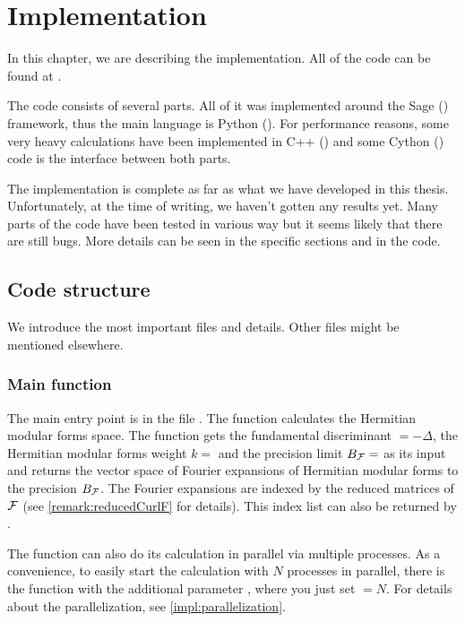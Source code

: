 
\section{Implementation}
\label{chapter:impl}

In this chapter, we are describing the implementation. All of the code can be found at \cite{Zeyer13Github}.

The code consists of several parts.
All of it was implemented around the Sage (\cite{sage}) framework, thus the main language is Python (\cite{python}).
For performance reasons, some very heavy calculations have been implemented in C++ (\cite{cpp}) and some Cython (\cite{cython}) code is the interface between both parts.

The implementation is complete as far as what we have developed in this thesis. Unfortunately, at the time of writing, we haven't gotten any results yet. Many parts of the code have been tested in various way but it seems likely that there are still bugs. More details can be seen in the specific sections and in the code.

\subsection{Code structure}

We introduce the most important files and details. Other files might be mentioned elsewhere.

\subsubsection{Main function }
The main entry point is in the file .
The function  calculates the Hermitian modular forms space.
The function gets the fundamental discriminant  $= - \Delta$, the Hermitian modular forms weight $k =$  and the precision limit $B_{\mathcal{F}} =$  as its input and returns the vector space of Fourier expansions of Hermitian modular forms to the precision $B_{\mathcal{F}}$. The Fourier expansions are indexed by the reduced matrices of $\mathcal{F}$ (see \cref{remark:reducedCurlF} for details). This index list can also be returned by .

The function can also do its calculation in parallel via multiple processes. As a convenience, to easily start the calculation with $N$ processes in parallel, there is the function  with the additional parameter , where you just set  $=N$. For details about the parallelization, see \cref{impl:parallelization}.

